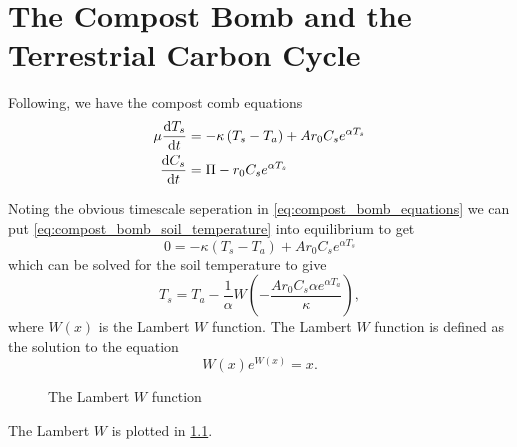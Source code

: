 \chapter{The Compost Bomb and the Terrestrial Carbon Cycle}
\graphicspath{{global_bomb/figs/}}


Following\cite{Luke2011}, we have the compost comb equations
\begin{subequations}
  \label{eq:compost_bomb_equations}
  \begin{align}
    \mu \dv{T_s}{t} &= - \kappa \left(T_s - T_a\right) + Ar_0C_se^{\alpha T_s} \label{eq:compost_bomb_soil_temperature} \\
    \dv{C_s}{t} &= \Pi - r_0C_se^{\alpha T_s} \label{eq:compost_bomb_soil_carbon}
  \end{align}
\end{subequations}

Noting the obvious timescale seperation in \cref{eq:compost_bomb_equations} we can put \cref{eq:compost_bomb_soil_temperature} into
equilibrium to get
\begin{equation*}
  0 = - \kappa \left(T_s - T_a\right) + Ar_0C_se^{\alpha T_s}
\end{equation*}
which can be solved for the soil temperature to  give
\begin{equation}
  \label{eq:soil_temperature_equilibrium}
  T_s = T_a - \frac{1}{\alpha} W\left(-\frac{Ar_0C_s \alpha e^{\alpha T_a}}{\kappa} \right),
\end{equation}
where $W(x)$ is the Lambert $W$ function. The Lambert $W$ function is defined as the solution to the equation
\begin{equation}
  \label{eq:lambert_W}
  W(x)e^{W(x)} = x.
\end{equation}

\begin{figure}
  \centering
  \caption{The Lambert $W$ function}
  \label{fig:lambert_W}
\end{figure}
The Lambert $W$ is plotted in \cref{fig:lambert_W}.

